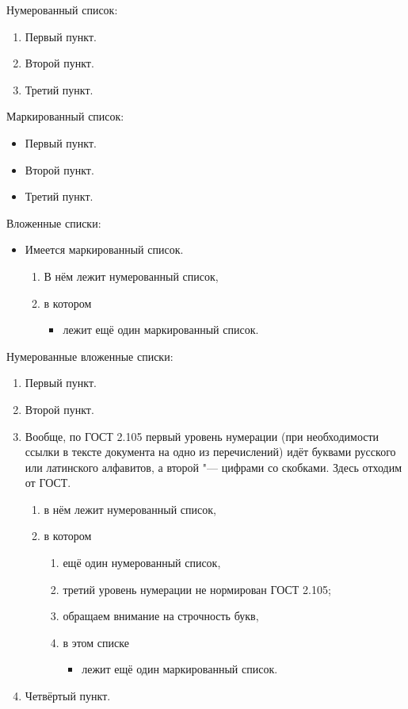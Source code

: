 \noindent Нумерованный список:
\begin{enumerate}
  \item Первый пункт.
  \item Второй пункт.
  \item Третий пункт.
\end{enumerate}

\noindent Маркированный список:
\begin{itemize}
  \item Первый пункт.
  \item Второй пункт.
  \item Третий пункт.
\end{itemize}

\noindent Вложенные списки:
\begin{itemize}
  \item Имеется маркированный список.
  \begin{enumerate}
    \item В нём лежит нумерованный список,
    \item в котором
    \begin{itemize}
      \item лежит ещё один маркированный список.
    \end{itemize}    
  \end{enumerate}
\end{itemize}

\noindent Нумерованные вложенные списки:
\begin{enumerate}
  \item Первый пункт.
  \item Второй пункт.
  \item Вообще, по ГОСТ 2.105 первый уровень нумерации
  (при необходимости ссылки в тексте документа на одно из перечислений)
  идёт буквами русского или латинского алфавитов,
  а второй "--- цифрами со скобками.
  Здесь отходим от ГОСТ.
    \begin{enumerate}
      \item в нём лежит нумерованный список,
      \item в котором
        \begin{enumerate}
          \item ещё один нумерованный список,
          \item третий уровень нумерации не нормирован ГОСТ 2.105;
          \item обращаем внимание на строчность букв,
          \item в этом списке
          \begin{itemize}
            \item лежит ещё один маркированный список.
          \end{itemize}    
        \end{enumerate}

    \end{enumerate}

  \item Четвёртый пункт.
\end{enumerate}

